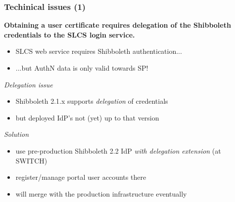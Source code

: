 \documentclass{beamer}
\newcommand{\+}{\vspace{1em}}
\begin{document}
\begin{frame}
  \frametitle{Techinical issues (1)}
  
  {\bf Obtaining a user certificate requires delegation of the Shibboleth
  credentials to the SLCS login service.}
  \begin{itemize}
  \item SLCS web service requires Shibboleth authentication...
  \item ...but AuthN data is only valid towards SP!
  \end{itemize}

  \+ 
  \emph{Delegation issue}
  \begin{itemize}
  \item Shibboleth 2.1.x supports \emph{delegation} of credentials
  \item but deployed IdP's not (yet) up to that version
  \end{itemize}

  \+
  \emph{Solution}
  \begin{itemize}
  \item use pre-production Shibboleth 2.2 IdP \emph{with delegation extension} (at SWITCH)
  \item register/manage portal user accounts there
  \item will merge with the production infrastructure eventually
  \end{itemize}
\end{frame}
\end{document}
